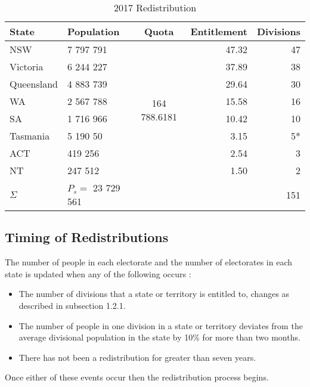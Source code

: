 \documentclass{report}
\begin{document}
  \begin{table}[h]
  \label{tab:2017Redis}
  \begin{tabular}{l|l|c|r|r}
  State      & Population             & Quota            & Entitlement & Divisions \\
 \hline \hline
  NSW        & 7 797 791              & \multirow{8}{*}{164 788.6181}     & 47.32       & 47        \\
  Victoria   & 6 244 227              &                  & 37.89       & 38        \\
  Queensland & 4 883 739              &                  & 29.64       & 30        \\
  WA         & 2 567 788              &                  & 15.58       & 16        \\
  SA         & 1 716 966              &                  & 10.42       & 10        \\
  Tasmania   & 5 190 50               &                  & 3.15        & 5*        \\
  ACT        & 419 256                &                  & 2.54        & 3         \\
  NT         & 247 512                &                  & 1.50        & 2         \\
 \hline
  $\Sigma$   & $P_s = $ 23 729 561    &                  &             & 151       \\

  \end{tabular}
  \caption{2017 Redistribution}
  \end{table}

  \subsection{Timing of Redistributions}
  The number of people in each electorate and the number of electorates in each state is updated when any of the following occurs \cite{aec:redis}:
  \begin{itemize}
    \item The number of divisions that a state or territory is entitled to, changes as described in subsection 1.2.1.
    \item The number of people in one division in a state or territory deviates from the average divisional population in the state by 10\% for more than two months.
    \item There has not been a redistribution for greater than seven years.
  \end{itemize}
  Once either of these events occur then the redistribution process begins.
\end{document}
